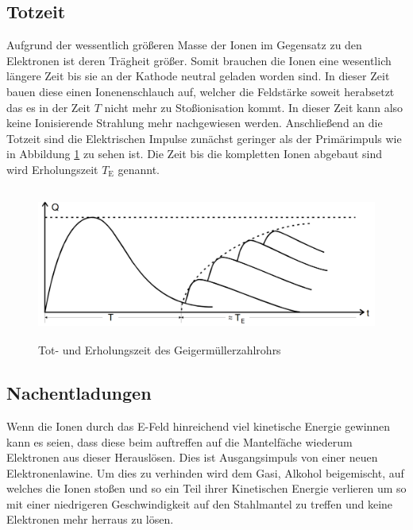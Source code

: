 \subsection{Totzeit}
Aufgrund der wessentlich größeren Masse der Ionen im Gegensatz zu den Elektronen ist deren Trägheit größer. Somit brauchen die Ionen eine wesentlich längere Zeit bis sie an der Kathode neutral geladen worden sind. In dieser Zeit bauen diese einen Ionenenschlauch auf, welcher die Feldstärke soweit herabsetzt das es in der Zeit $T$ nicht mehr zu Stoßionisation kommt. In dieser Zeit kann also keine Ionisierende Strahlung mehr nachgewiesen werden. Anschließend an die Totzeit sind die Elektrischen Impulse zunächst geringer als der Primärimpuls wie in Abbildung \ref{fig:tot} zu sehen ist. Die Zeit bis die kompletten Ionen abgebaut sind wird Erholungszeit $T_\text{E}$ genannt.
\begin{figure}
  \centering
  \includegraphics[height=5cm]{picture/Nachentladung.pdf}
  \caption{Tot- und Erholungszeit des Geigermüllerzahlrohrs \cite{sample}}
  \label{fig:tot}
\end{figure}


\subsection{Nachentladungen}
Wenn die Ionen durch das E-Feld hinreichend viel kinetische Energie gewinnen kann es seien, dass diese beim auftreffen auf die Mantelfäche wiederum Elektronen aus dieser Herauslösen. Dies ist Ausgangsimpuls von einer neuen Elektronenlawine. Um dies zu verhinden wird dem Gasi, Alkohol beigemischt, auf welches die Ionen stoßen und so ein Teil ihrer Kinetischen Energie verlieren um so mit einer niedrigeren Geschwindigkeit auf den Stahlmantel zu treffen und keine Elektronen mehr herraus zu lösen.


